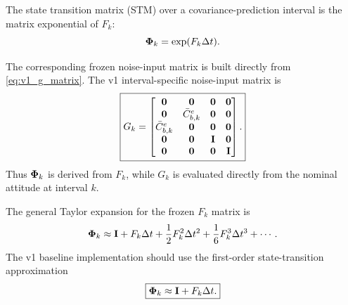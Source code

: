 The state transition matrix (STM) over a covariance-prediction interval is the
matrix exponential of $F_k$:
\begin{equation}
\boldsymbol{\Phi}_k
=
\exp(F_k\Delta t).
\end{equation}

The corresponding frozen noise-input matrix is built directly from
\cref{eq:v1_g_matrix}. The v1 interval-specific noise-input matrix is
\begin{equation}
\boxed{
G_k =
\begin{bmatrix}
\mathbf{0} & \mathbf{0} & \mathbf{0} & \mathbf{0}\\
\mathbf{0} & \bar C_{b,k}^{e} & \mathbf{0} & \mathbf{0}\\
\bar C_{b,k}^{e} & \mathbf{0} & \mathbf{0} & \mathbf{0}\\
\mathbf{0} & \mathbf{0} & \mathbf{I} & \mathbf{0}\\
\mathbf{0} & \mathbf{0} & \mathbf{0} & \mathbf{I}
\end{bmatrix}.
}
\label{eq:v1_gk_matrix}
\end{equation}
Thus $\boldsymbol{\Phi}_k$ is derived from $F_k$, while $G_k$ is evaluated directly from the
nominal attitude at interval $k$.

The general Taylor expansion for the frozen $F_k$ matrix is
\begin{equation}
\boldsymbol{\Phi}_k
\approx
\mathbf{I}
+
F_k\Delta t
+
\frac{1}{2}F_k^2\Delta t^2
+
\frac{1}{6}F_k^3\Delta t^3
+
\cdots.
\end{equation}
The v1 baseline implementation should use the first-order state-transition
approximation
\begin{equation}
\boxed{
\boldsymbol{\Phi}_k
\approx
\mathbf{I}+F_k\Delta t.
}
\label{eq:v1_phi_first_order}
\end{equation}

